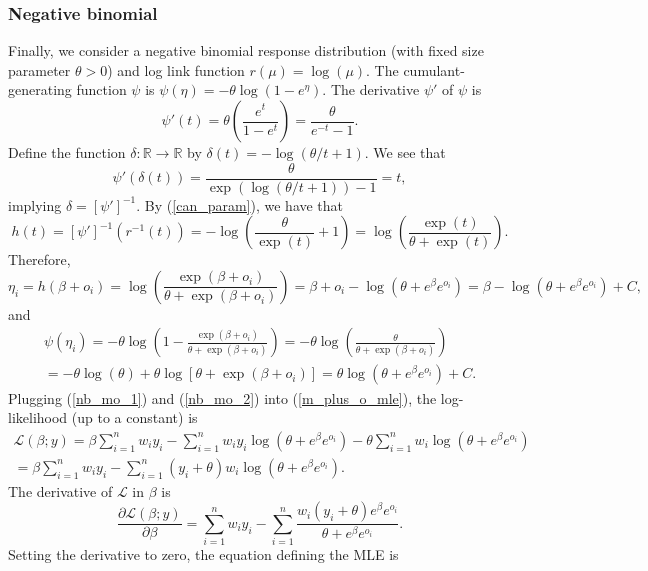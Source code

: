 \documentclass[12pt]{article}
\begin{document}
\begin{appendices}
\begin{refsection}
		\subsubsection*{Negative binomial}
		Finally, we consider a negative binomial response distribution (with fixed size parameter $\theta > 0$) and log link function $r(\mu) = \log(\mu)$. The cumulant-generating function $\psi$ is
		$\psi(\eta) = -\theta \log(1 - e^\eta).$ The derivative $\psi'$ of $\psi$ is
		$$ \psi'(t) = \theta \left(\frac{e^t}{1 - e^t}\right) = \frac{\theta}{e^{-t} - 1}.$$ Define the function $\delta: \mathbb{R} \to \mathbb{R}$ by $\delta(t) = -\log\left(\theta/t + 1 \right).$ We see that
		$$\psi'(\delta(t)) = \frac{\theta}{\exp\left(\log(\theta/t + 1 )\right) - 1} = t,$$ implying $\delta = [\psi']^{-1}.$ By (\ref{can_param}), we have that
		$$
		h(t) = [\psi']^{-1}(r^{-1}(t)) = -\log\left(\frac{\theta}{\exp(t)} + 1 \right) = \log\left(\frac{\exp(t)}{\theta + \exp(t)}\right).
		$$
		Therefore,
		\begin{equation}\label{nb_mo_1}
		\eta_i = h(\beta + o_i) = \log\left(\frac{\exp(\beta+o_i)}{\theta + \exp(\beta + o_i)} \right) = \beta + o_i - \log\left(\theta + e^{\beta}e^{o_i}\right) = \beta - \log\left(\theta + e^{\beta}e^{o_i} \right) + C,
		\end{equation}
		and
		\begin{multline}\label{nb_mo_2}
		\psi(\eta_i) = -\theta\log\left(1 - \frac{\exp(\beta+o_i)}{\theta + \exp(\beta + o_i)} \right) = -\theta \log \left(\frac{\theta}{\theta + \exp(\beta + o_i)} \right) \\ = -\theta \log (\theta) + \theta \log[\theta + \exp(\beta + o_i)] = \theta \log(\theta + e^{\beta}e^{o_i}) + C.
		\end{multline}
		Plugging (\ref{nb_mo_1}) and (\ref{nb_mo_2}) into (\ref{m_plus_o_mle}), the log-likelihood (up to a constant) is
		\begin{multline*}
		\mathcal{L}(\beta; y) = \beta \sum_{i=1}^n w_i y_i - \sum_{i=1}^n w_i y_i \log(\theta + e^\beta e^{o_i}) - \theta \sum_{i=1}^n w_i \log(\theta + e^\beta  e^{o_i}) \\ = \beta \sum_{i=1}^n w_i y_i - \sum_{i=1}^n (y_i + \theta)w_i\log(\theta + e^\beta e^{o_i}).
		\end{multline*}
		The derivative of $\mathcal{L}$ in $\beta$ is
		$$\frac{\partial \mathcal{L}(\beta;y)}{\partial \beta} = \sum_{i=1}^n w_i y_i  - \sum_{i=1}^n \frac{w_i(y_i + \theta) e^{\beta} e^{o_i}}{ \theta + e^{\beta} e^{o_i}}.$$
		Setting the derivative to zero, the equation defining the MLE is

\end{refsection}
\end{appendices}
\end{document}
